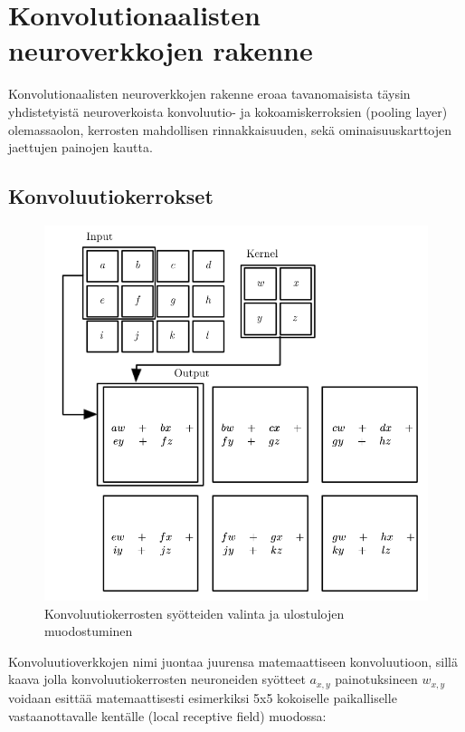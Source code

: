 \documentclass[finnish]{tktltiki2}
\theoremstyle{definition}
\theoremstyle{remark}
\begin{document}
  \section{Konvolutionaalisten neuroverkkojen rakenne}
    Konvolutionaalisten neuroverkkojen rakenne eroaa tavanomaisista täysin yhdistetyistä neuroverkoista konvoluutio- ja kokoamiskerroksien (pooling layer) olemassaolon, kerrosten mahdollisen rinnakkaisuuden, sekä ominaisuuskarttojen jaettujen painojen kautta.   
    
    \subsection{Konvoluutiokerrokset}
    
    \begin{figure}[h]
    \label{pic:convolution}
    \centering
    \includegraphics[scale=0.4]{convolution}
    \caption{Konvoluutiokerrosten syötteiden valinta ja ulostulojen muodostuminen \cite{Goodfellow-et-al-2016}}
    \end{figure}

    Konvoluutioverkkojen nimi juontaa juurensa matemaattiseen konvoluutioon, sillä kaava jolla konvoluutiokerrosten neuroneiden syötteet $a_{x,y}$ painotuksineen $w_{x,y}$ voidaan esittää matemaattisesti esimerkiksi 5x5 kokoiselle paikalliselle vastaanottavalle kentälle (local receptive field) muodossa:
\end{document}
